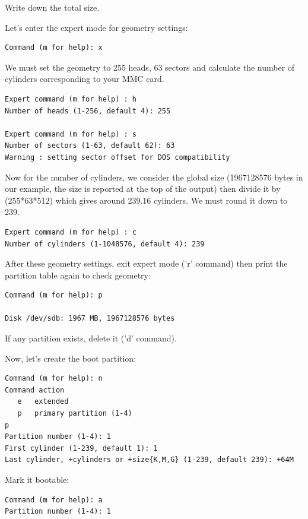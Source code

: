 Write down the total size.

Let's enter the expert mode for geometry settings:

\begin{verbatim}
Command (m for help): x
\end{verbatim}

We must set the geometry to 255 heads, 63 sectors and calculate the
number of cylinders corresponding to your MMC card.

\begin{verbatim}
Expert command (m for help) : h
Number of heads (1-256, default 4): 255 

Expert command (m for help) : s 
Number of sectors (1-63, default 62): 63
Warning : setting sector offset for DOS compatibility
\end{verbatim}

Now for the number of cylinders, we consider the global size
(1967128576 bytes in our example, the size is reported
at the top of the  output)
then divide it by (255*63*512) which gives around
239.16 cylinders. We must round it down to 239.

\begin{verbatim}
Expert command (m for help) : c
Number of cylinders (1-1048576, default 4): 239 
\end{verbatim}

After these geometry settings, exit expert mode ('r' command) then
print the partition table again to check geometry:

\begin{verbatim}
Command (m for help): p 

Disk /dev/sdb: 1967 MB, 1967128576 bytes
\end{verbatim}

If any partition exists, delete it ('d' command).

Now, let's create the boot partition:

\begin{verbatim}
Command (m for help): n 
Command action 
   e   extended 
   p   primary partition (1-4) 
p 
Partition number (1-4): 1 
First cylinder (1-239, default 1): 1 
Last cylinder, +cylinders or +size{K,M,G} (1-239, default 239): +64M
\end{verbatim}

Mark it bootable: 

\begin{verbatim}
Command (m for help): a
Partition number (1-4): 1
\end{verbatim}

